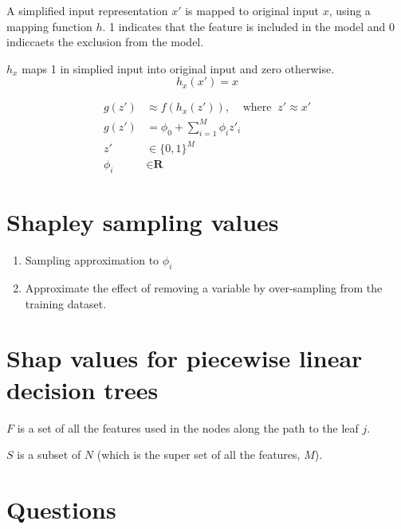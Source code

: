 \documentclass{article}
\begin{document}
A simplified input representation $x'$ is mapped to original input $x$, using a mapping function $h$. 1 indicates that the feature is included in the model and 0 indiccaets the exclusion from the model.

$h_x$ maps 1 in simplied input into original input and zero otherwise.
\begin{equation}
h_x (x') = x 
\end{equation}

\begin{align}
        g(z') &\approx f(h_x(z')), \mspace{20mu} \text{where} \mspace{10mu}z' \approx x'\\
        g(z') &= \phi_0 + \sum_{i=1}^M \phi_i z'_i\\
        z' &\in \{0, 1\}^M \\
        \phi_i &\in \textbf{R}
\end{align}


\section{Shapley sampling values}

\begin{enumerate}
        \item Sampling approximation to $\phi_i$
        \item Approximate the effect of removing a variable by over-sampling from the training dataset.
\end{enumerate}



\section{Shap values for piecewise linear decision trees}

$F$ is a set of all the features used in the nodes along the path to the leaf $j$. 

$S$ is a subset of $N$ (which is the super set of all the features, $M$). 


\section{Questions}
\end{document}
